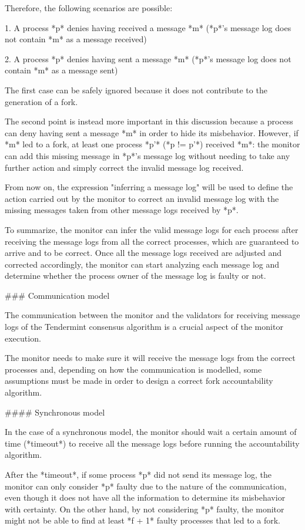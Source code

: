 \documentclass[a4paper,11pt,oneside]{report}
\begin{document}
\begin{markdown}
Therefore, the following scenarios are possible:
 
1. A process *p* denies having received a message *m* (*p*'s message log does not contain *m* as a message received)  

2. A process *p* denies having sent a message *m* (*p*'s message log does not contain *m* as a message sent) 

The first case can be safely ignored because it does not contribute to the generation of a fork.

The second point is instead more important in this discussion because a process can deny having sent a message *m* in order to hide its misbehavior. 
However, if *m* led to a fork, at least one process *p'* (*p != p'*) received *m*: the monitor can add this missing message in *p*'s message log without needing to take any further action and simply correct the invalid message log received. 

From now on, the expression "inferring a message log" will be used to define the action carried out by the monitor to correct an invalid message log with the missing messages taken from other message logs received by *p*.

To summarize, the monitor can infer the valid message logs for each process after receiving the message logs from all the correct processes, which are guaranteed to arrive and to be correct.
Once all the message logs received are adjusted and corrected accordingly, the monitor can start analyzing each message log and determine whether the process owner of the message log is faulty or not.

### Communication model

The communication between the monitor and the validators for receiving message logs of the Tendermint consensus algorithm is a crucial aspect of the monitor execution.

The monitor needs to make sure it will receive the message logs from the correct processes and, depending on how the communication is modelled, some assumptions must be made in order to design a correct fork accountability algorithm.

#### Synchronous model

In the case of a synchronous model, the monitor should wait a certain amount of time (*timeout*) to receive all the message logs before running the accountability algorithm.

After the *timeout*, if some process *p* did not send its message log, the monitor can only consider *p* faulty due to the nature of the communication, even though it does not have all the information to determine its misbehavior with certainty. 
On the other hand, by not considering *p* faulty, the monitor might not be able to find at least *f + 1* faulty processes that led to a fork.


\end{markdown}
\end{document}
